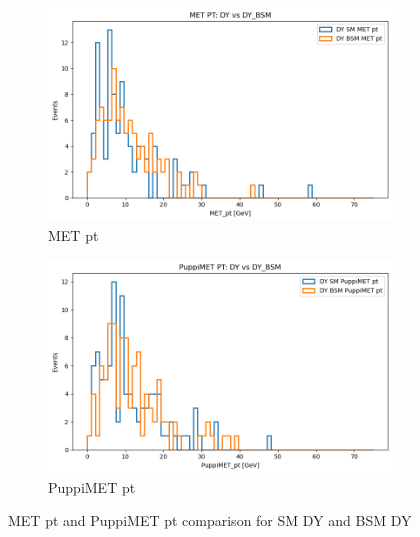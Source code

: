 \documentclass{CUP-JNL-DTM}%
\theoremstyle{definition}
\numberwithin{equation}{section}
\begin{document}
\begin{figure}[H]
    \begin{subfigure}{.5\textwidth}
      \centering
      \includegraphics[width=.85\linewidth]{img/met_pt.png}
      \caption{MET pt}
      \label{fig:sm_metpt}
    \end{subfigure}%
    \begin{subfigure}{.5\textwidth}
      \centering
      \includegraphics[width=.85\linewidth]{img/pmet_pt.png}
      \caption{PuppiMET pt}
      \label{fig:sm_pmetpt}
    \end{subfigure}
    \caption{MET pt and PuppiMET pt comparison for SM DY and BSM DY}
    \label{fig:metpt}
\end{figure}
\end{document}
